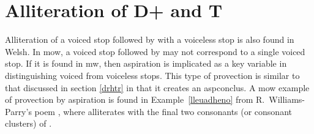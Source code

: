 \section{Alliteration of \gls{D}+ and \gls{T}}%
\label{dht}
Alliteration of a voiced stop followed by  with a voiceless stop is also found in Welsh. In \gls{mow}, a voiced stop followed by  may not correspond to a single voiced stop. If it is found in \gls{mw}, then aspiration is implicated as a key variable in distinguishing voiced from voiceless stops. This type of provection is similar to that discussed in section \ref{drhtr} in that it creates an \gls{aspconclus}. A \gls{mow} example of provection by aspiration is found in Example~\ref{lleuadheno} from R.~Williams-Parry's poem , where  alliterates with the final two consonants (or consonant clusters) of . 

